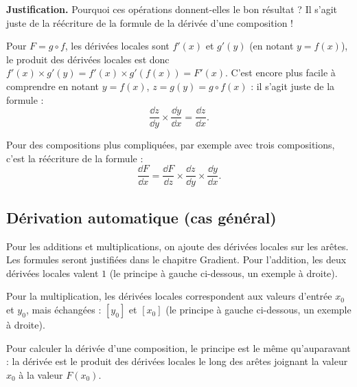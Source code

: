 \documentclass[11pt,class=report,crop=false]{standalone}
\begin{document}
\bigskip

\textbf{Justification.} Pourquoi ces opérations donnent-elles le bon résultat ? Il s'agit juste de la réécriture de la formule de la dérivée d'une composition !

Pour $F = g \circ f$, les dérivées locales sont $f'(x)$ et $g'(y)$ (en notant $y=f(x)$), le produit des dérivées locales est donc $f'(x) \times g'(y) = 
f'(x) \times g'(f(x)) = F'(x)$.
C'est encore plus facile à comprendre en notant $y = f(x)$, $z=g(y) = g\circ f(x)$ : il s'agit juste de la formule :
$$\frac{\dd z}{\dd y} \times \frac{\dd y}{\dd x} = \frac{\dd z}{\dd x}.$$


Pour des compositions plus compliquées, par exemple avec trois compositions, c'est la réécriture de la formule :
$$\frac{\dd F}{\dd x} = \frac{\dd F}{\dd z} \times\frac{\dd z}{\dd y} \times \frac{\dd y}{\dd x}.$$



%
%



\subsection{Dérivation automatique (cas général)}

Pour les additions et multiplications, on ajoute des dérivées locales sur les arêtes.
Les formules seront justifiées dans le chapitre \og{}Gradient\fg{}.
Pour l'addition, les deux dérivées locales valent $1$ (le principe à gauche ci-dessous, un exemple à droite).


Pour la multiplication, les dérivées locales correspondent aux valeurs d'entrée $x_0$ et $y_0$, mais échangées : $[y_0]$ et $[x_0]$ (le principe à gauche ci-dessous, un exemple à droite).


Pour calculer la dérivée d'une composition, le principe est le même qu'auparavant :
la dérivée est le produit des dérivées locales le long des arêtes joignant la valeur $x_0$ à la valeur $F(x_0)$.
\end{document}
